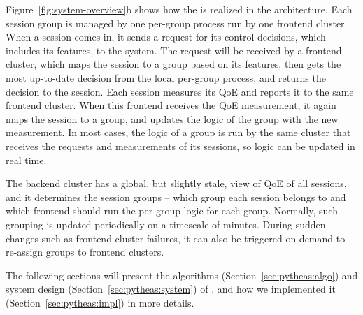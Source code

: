 Figure~\ref{fig:system-overview}b shows how the \idea is realized in the \name architecture.
Each session group is managed
by one per-group \mab process run by one frontend cluster.  When a session
comes in, it sends a request for its control decisions, which includes its features,
to the \name system.  The request will be received by a frontend
cluster, which maps the session to a group based on its features, then
gets the  most up-to-date decision from the local per-group \mab process, and
returns the decision to the session.  Each  session measures its QoE and reports it  to the same frontend cluster.  When this frontend
receives the QoE measurement, it again maps the session to a group, and
updates the \mab logic of the group with the new measurement.  
In most cases, the
\mab logic of a group is run by the same cluster that 
receives the requests and
measurements of its sessions, 
so \mab logic can be updated in real time. 



 The backend cluster has a global, but
slightly stale, view of QoE of all sessions, and it determines the session
groups -- which group each session belongs to and which frontend should run
the per-group logic for each group.  Normally, such grouping is updated
periodically on a timescale of minutes. During sudden changes such as frontend cluster failures, it can also be triggered on demand to re-assign groups to frontend clusters.


The following sections will present the algorithms (Section~\ref{sec:pytheas:algo}) and system design (Section~\ref{sec:pytheas:system}) of \name, and how we implemented it (Section~\ref{sec:pytheas:impl}) in more details.


%


